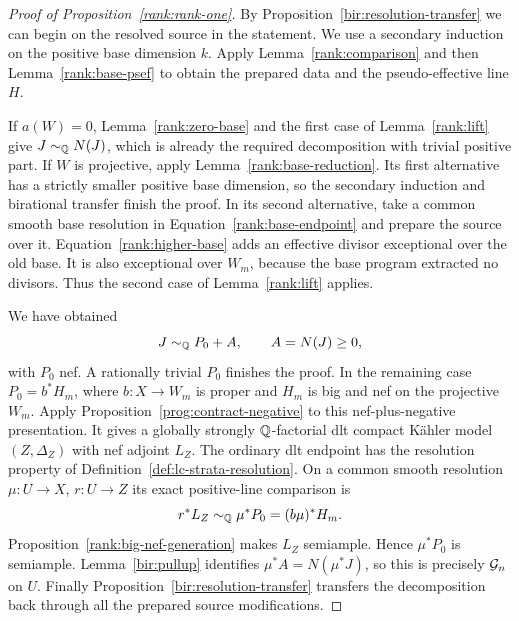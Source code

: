 \begin{proof}[Proof of Proposition~\ref{rank:rank-one}]
By Proposition~\ref{bir:resolution-transfer} we can begin on the
resolved source in the statement.  We use a secondary induction on
the positive base dimension \(k\).  Apply
Lemma~\ref{rank:comparison} and then Lemma~\ref{rank:base-psef}
to obtain the prepared data and the pseudo-effective line \(H\).

If \(a(W)=0\), Lemma~\ref{rank:zero-base} and the first case of
Lemma~\ref{rank:lift} give
\(J\sim_{\mathbb Q}N(J)\), which is already the required decomposition
with trivial positive part.  If \(W\) is projective, apply
Lemma~\ref{rank:base-reduction}.  Its first alternative has a
strictly smaller positive base dimension, so the secondary induction
and birational transfer finish the proof.  In its second alternative,
take a common smooth base resolution in
Equation~\eqref{rank:base-endpoint} and prepare the source over it.
Equation~\eqref{rank:higher-base} adds an effective divisor
exceptional over the old base.  It is also exceptional over \(W_m\),
because the base program extracted no divisors.  Thus the second
case of Lemma~\ref{rank:lift} applies.

We have obtained
\[
                    J\sim_{\mathbb Q}P_0+A,\qquad A=N(J)\geq0,
\]
with \(P_0\) nef.  A rationally trivial \(P_0\) finishes the proof.
In the remaining case \(P_0=b^*H_m\), where \(b:X\to W_m\)
is proper and \(H_m\) is big and nef on the projective \(W_m\).
Apply Proposition~\ref{prog:contract-negative} to this
nef-plus-negative presentation.  It gives a globally strongly
\(\mathbb Q\)-factorial dlt compact Kähler model \((Z,\Delta_Z)\) with nef
adjoint \(L_Z\).  The ordinary dlt endpoint has the resolution property
of Definition~\ref{def:lc-strata-resolution}.  On a common smooth resolution
\(\mu:U\to X\), \(r:U\to Z\) its exact positive-line comparison is
\[
                  r^*L_Z\sim_{\mathbb Q}\mu^*P_0
                        =(b\mu)^*H_m .
\]
Proposition~\ref{rank:big-nef-generation} makes \(L_Z\) semiample.
Hence \(\mu^*P_0\) is semiample.  Lemma~\ref{bir:pullup} identifies
\(\mu^*A=N(\mu^*J)\), so this is precisely \(\mathcal G_n\) on \(U\).
Finally Proposition~\ref{bir:resolution-transfer} transfers the
decomposition back through all the prepared source modifications.
\end{proof}
